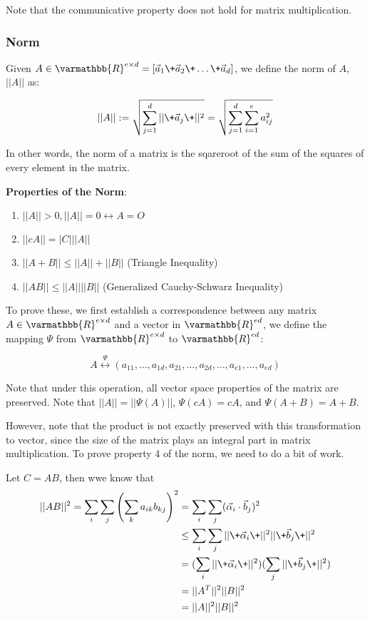 \documentclass[11 pt, twoside]{article}
\begin{document}
Note that the communicative property does not hold for matrix multiplication.

\subsubsection{Norm}

Given $A \in \varmathbb{R}^{e \times d} = [\vec{a}_1 \+ \vec{a}_2 \+ \dots \+
\vec{a}_d]$, we define the norm of $A$, $||A||$ as:

\[
||A|| := \sqrt{\sum_{j = 1}^d ||\+\vec{a}_j\+||^2} = \sqrt{\sum_{j=1}^d
\sum_{i=1}^e a_{ij}^2}
\]

In other words, the norm of a matrix is the sqareroot of the sum of the squares
of every element in the matrix.

\textbf{Properties of the Norm}:
\begin{enumerate}
\item $||A|| > 0, ||A|| = 0 \leftrightarrow A = O$
\item $||cA|| = |C|||A||$
\item $||A+B|| \leq ||A|| + ||B||$ (Triangle Inequality)
\item $||AB|| \leq ||A||||B||$ (Generalized Cauchy-Schwarz Inequality)
\end{enumerate}

To prove these, we first establish a correspondence between any matrix $A \in
\varmathbb{R}^{e \times d}$ and a vector in $\varmathbb{R}^{ed}$, we define the
mapping $\Psi$ from $\varmathbb{R}^{e \times d}$ to $\varmathbb{R}^{ed}$:

\[
A \overset{\Psi}{\longleftrightarrow} (a_{11}, \dots, a_{1d}, a_{21}, \dots,
a_{2d}, \dots, a_{e1}, \dots, a_{ed})
\]

Note that under this operation, all vector space properties of the matrix are
preserved. Note that $||A|| = ||\Psi(A)||$, $\Psi(cA) = cA$, and $\Psi(A + B) =
A + B$.

However, note that the product is not exactly preserved with this transformation
to vector, since the size of the matrix plays an integral part in matrix
multiplication. To prove property 4 of the norm, we need to do a bit of work.

Let $C = AB$, then wwe know that
\begin{align*}
||AB||^2 = \sum_i \sum_j \left(\sum_k a_{ik}b_{kj}\right)^2 &= \sum_i \sum_j
(\vec{\alpha}_i \cdot \vec{b}_j)^2 \\
&\leq \sum_i \sum_j ||\+\vec{\alpha}_i\+||^2 ||\+\vec{b}_j\+||^2\\
&= (\sum_i ||\+\vec{\alpha}_i\+||^2)(\sum_j ||\+\vec{b}_j\+||^2)\\
&= ||A^T||^2 ||B||^2\\
&= ||A||^2 ||B||^2
\end{align*}
\end{document}
